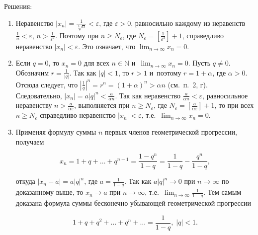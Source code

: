 Решения:
\begin{enumerate}

\item Неравенство $\displaystyle |x_{n}| = \frac{1}{\sqrt[3]{n}} < \varepsilon$,
где $\varepsilon > 0$, равносильно каждому из неравенств
$\displaystyle \frac{1}{n} < \varepsilon$, $\displaystyle n > \frac{1}{\varepsilon^{2}}$.
Поэтому при $n \geqslant N_{\varepsilon}$,
где $\displaystyle N_{\varepsilon} = \left[ \frac{1}{\varepsilon^{3}} \right] + 1$,
справедливо неравенство $|x_{n}| < \varepsilon$.
Это означает, что $\displaystyle \lim_{n \to \infty} x_{n} = 0$.

\item Если $q = 0$, то $x_{n} = 0$ для всех
$n \in \mathbb{N}$ и~$\displaystyle \lim_{n \to \infty} x_{n} = 0$. Пусть $q \ne 0$.
Обозначим $\displaystyle r = \frac{1}{|q|}$. Так как $|q| < 1$, то $r >1$
и~поэтому $r = 1 + \alpha$, где $\alpha > 0$. Отсюда следует, что
$\displaystyle \left| \frac{1}{q} \right|^{n} = r^{n} = (1 + \alpha)^{n} > \alpha n$
(см.\ п.\ 2, г). \\
Следовательно, $\displaystyle |x_{n}| = a|q|^{n} < \frac{a}{\alpha n}$.
Так как неравенство $\displaystyle \frac{a}{\alpha n} < \varepsilon$,
равносильное неравенству $\displaystyle n > \frac{a}{\alpha \varepsilon}$,
выполняется при $n \geqslant N_{\varepsilon}$,
где $\displaystyle N_{\varepsilon} = \left[ \frac{a}{\alpha \varepsilon} \right] + 1$,
то при всех $n \geqslant N_{\varepsilon}$ справедливо неравенство $|x_{n}| < \varepsilon$,
т.е.\ $\displaystyle \lim_{n \to \infty} x_{n} = 0$.

\item Применяя формулу суммы $n$ первых членов геометрической прогрессии, получаем

\begin{equation*}
\displaystyle x_{n} = 1 + q + \dots + q^{n-1} =
\frac{1 - q^{n}}{1 - q} =
\frac{1}{1 - q} - \frac{q^{n}}{1 - q},
\end{equation*}

\noindent
откуда $|x_{n} - a| = a|q|^{n}$, где $\displaystyle a = \frac{1}{1 - q}$.
Так как $a|q|^{n} \to 0$ при $n \to \infty$ по доказанному выше,
то $x_{n} \to a$ при $n \to \infty$,
т.е.\ $\displaystyle \lim_{n \to \infty} \frac{1}{1 - q}$.
Тем самым доказана формула суммы бесконечно убывающей геометрической прогрессии

\begin{equation*}
\displaystyle 1 + q + q^{2} + \dots + q^{n} + \dots = \frac{1}{1 - q}, \;
|q| < 1.
\end{equation*}


\end{enumerate}
